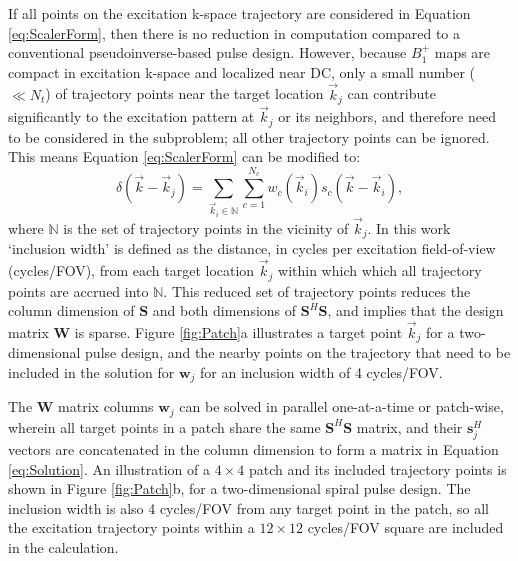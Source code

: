 \par If all points on the excitation k-space trajectory are considered in Equation \ref{eq:ScalerForm},
then there is no reduction in computation compared to a conventional pseudoinverse-based pulse design.
However, because $B_1^+$ maps are compact in excitation k-space and localized near DC,
only a small number ($\ll N_t$) of trajectory points near the target location $\vec{k}_j$ can contribute significantly
to the excitation pattern at $\vec{k}_j$ or its neighbors, 
and therefore need to be considered in the subproblem;
all other trajectory points can be ignored.
This means Equation \ref{eq:ScalerForm} can be modified to:
\begin{equation}
\delta(\vec{k}-\vec{k}_j) = \sum_{\vec{k}_i \in \mathbb{N}}\sum_{c=1}^{N_c} w_c(\vec{k}_i) s_c(\vec{k}-\vec{k}_i),
\end{equation} 
where $\mathbb{N}$ is the set of trajectory points in the vicinity of $\vec{k}_j$. 
In this work `inclusion width' is defined as the distance, 
in cycles per excitation field-of-view (cycles/FOV), 
from each target location $\vec{k}_j$ within which which all trajectory points are accrued into $\mathbb{N}$.
This reduced set of trajectory points reduces the column dimension of $\bm{S}$
and both dimensions of $\bm{S}^H\bm{S}$,
and implies that the design matrix $\bm{W}$ is sparse.
Figure \ref{fig:Patch}a illustrates a target point $\vec{k}_j$ for a two-dimensional pulse design, 
and the nearby points on the trajectory that need to be included in the solution for $\bm{w}_j$
for an inclusion width of 4 cycles/FOV.

\par The $\bm{W}$ matrix columns $\bm{w}_j$ can be solved in parallel one-at-a-time or patch-wise, 
wherein all target points in a patch share the same $\bm{S}^{H}\bm{S}$ matrix,
and their $\bm{s}_j^H$ vectors are concatenated in the column dimension
to form a matrix in Equation \ref{eq:Solution}. 
An illustration of a $4 \times 4$ patch and its included trajectory points is shown in Figure \ref{fig:Patch}b,
for a two-dimensional spiral pulse design. 
The inclusion width is also 4 cycles/FOV from any target point in the patch, 
so all the excitation trajectory points within a $12 \times 12$ cycles/FOV square are included in the calculation. 

